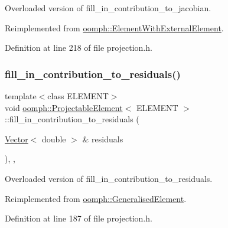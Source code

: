 Overloaded version of fill\+\_\+in\+\_\+contribution\+\_\+to\+\_\+jacobian. 



Reimplemented from \hyperlink{classoomph_1_1ElementWithExternalElement_ae5fb09552a8271e891438f8d058ca1b8}{oomph\+::\+Element\+With\+External\+Element}.



Definition at line 218 of file projection.\+h.

\mbox{\label{classoomph_1_1ProjectableElement_aeb0de899b7a5c7f498b2206ab00ef786}} 
\subsubsection{\texorpdfstring{fill\+\_\+in\+\_\+contribution\+\_\+to\+\_\+residuals()}{fill\_in\_contribution\_to\_residuals()}}
{\footnotesize\ttfamily template$<$class E\+L\+E\+M\+E\+NT$>$ \\
void \hyperlink{classoomph_1_1ProjectableElement}{oomph\+::\+Projectable\+Element}$<$ E\+L\+E\+M\+E\+NT $>$\+::fill\+\_\+in\+\_\+contribution\+\_\+to\+\_\+residuals (\begin{DoxyParamCaption}\item[{\hyperlink{classoomph_1_1Vector}{Vector}$<$ double $>$ \&}]{residuals }\end{DoxyParamCaption})\hspace{0.3cm}{\ttfamily [inline]}, {\ttfamily [protected]}, {\ttfamily [virtual]}}



Overloaded version of fill\+\_\+in\+\_\+contribution\+\_\+to\+\_\+residuals. 



Reimplemented from \hyperlink{classoomph_1_1GeneralisedElement_a310c97f515e8504a48179c0e72c550d7}{oomph\+::\+Generalised\+Element}.



Definition at line 187 of file projection.\+h.

\mbox{\label{classoomph_1_1ProjectableElement_a4b63733bc82062bf26be9ea0d18a7c08}} 
